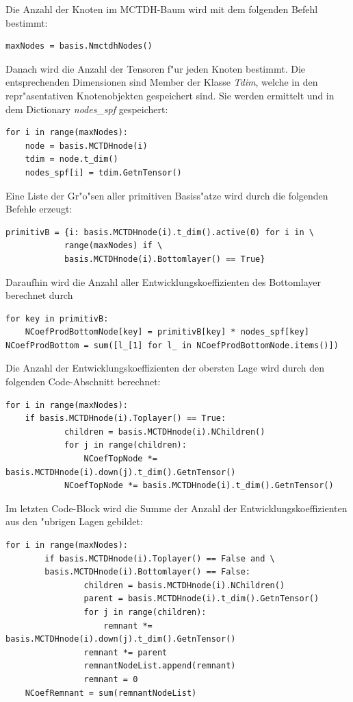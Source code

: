 Die Anzahl der Knoten im MCTDH-Baum wird mit dem folgenden Befehl bestimmt:
\begin{verbatim}
maxNodes = basis.NmctdhNodes()
\end{verbatim}
Danach wird die Anzahl der Tensoren f"ur jeden Knoten bestimmt.
Die entsprechenden Dimensionen sind Member der Klasse \textit{Tdim}, welche in den repr"asentativen
Knotenobjekten gespeichert sind. Sie werden ermittelt und in dem Dictionary \textit{nodes\_spf} gespeichert:
\begin{verbatim}
for i in range(maxNodes):
    node = basis.MCTDHnode(i)
    tdim = node.t_dim()
    nodes_spf[i] = tdim.GetnTensor() 
\end{verbatim}

Eine Liste der Gr"o"sen aller primitiven Basiss"atze wird durch die folgenden Befehle erzeugt:
\begin{verbatim}
primitivB = {i: basis.MCTDHnode(i).t_dim().active(0) for i in \
            range(maxNodes) if \
            basis.MCTDHnode(i).Bottomlayer() == True}
\end{verbatim}

Daraufhin wird die Anzahl aller Entwicklungskoeffizienten des Bottomlayer berechnet durch
\begin{verbatim}
for key in primitivB:
    NCoefProdBottomNode[key] = primitivB[key] * nodes_spf[key]
NCoefProdBottom = sum([l_[1] for l_ in NCoefProdBottomNode.items()])
\end{verbatim}

Die Anzahl der Entwicklungskoeffizienten der obersten Lage wird durch den folgenden Code-Abschnitt berechnet:

\begin{verbatim}
for i in range(maxNodes):
    if basis.MCTDHnode(i).Toplayer() == True:
            children = basis.MCTDHnode(i).NChildren()
            for j in range(children):
                NCoefTopNode *= basis.MCTDHnode(i).down(j).t_dim().GetnTensor()
            NCoefTopNode *= basis.MCTDHnode(i).t_dim().GetnTensor()
\end{verbatim}

Im letzten Code-Block wird die Summe der Anzahl der Entwicklungskoeffizienten aus
den "ubrigen Lagen gebildet:

\begin{verbatim}
for i in range(maxNodes):
        if basis.MCTDHnode(i).Toplayer() == False and \
        basis.MCTDHnode(i).Bottomlayer() == False:
                children = basis.MCTDHnode(i).NChildren()
                parent = basis.MCTDHnode(i).t_dim().GetnTensor()
                for j in range(children):
                    remnant *= basis.MCTDHnode(i).down(j).t_dim().GetnTensor() 
                remnant *= parent
                remnantNodeList.append(remnant)
                remnant = 0
    NCoefRemnant = sum(remnantNodeList)
\end{verbatim}

